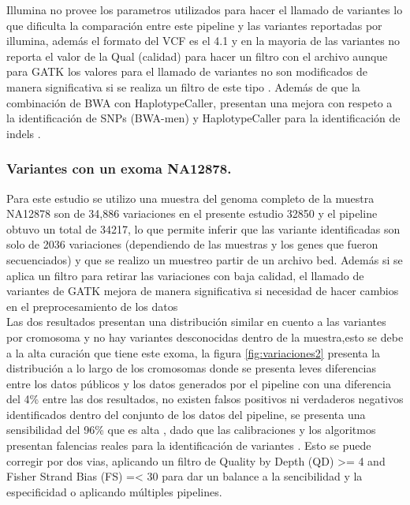 Illumina no provee los parametros utilizados para hacer el llamado de variantes lo que dificulta la comparación entre este pipeline y las variantes reportadas por illumina, además el formato del VCF es el 4.1 y en la mayoria de las variantes no reporta el valor de la Qual (calidad) para hacer un filtro con el archivo aunque para GATK los valores para el llamado de variantes no son modificados de manera significativa si se realiza un filtro de este tipo \cite{Hwang2015}. Además de que la combinación de BWA con HaplotypeCaller, presentan una mejora con respeto a la identificación de SNPs (BWA-men) y HaplotypeCaller para la identificación de indels \cite{Cornish2015}.
\subsubsection{Variantes con un exoma NA12878.}

Para este estudio se utilizo una muestra del genoma completo de la muestra NA12878 son de 34,886 variaciones \cite{Cornish2015} en el presente estudio 32850 y el pipeline obtuvo un total de 34217, lo que permite inferir que las variante identificadas son solo de 2036 variaciones (dependiendo de las muestras y los genes que fueron secuenciados) y que se realizo un muestreo partir de un archivo bed. Además si se aplica un filtro para retirar las variaciones con baja calidad, el llamado de variantes de GATK mejora de manera significativa si necesidad de hacer cambios en el preprocesamiento de los datos \cite{Warden2014} \\

Las dos resultados presentan una distribución similar en cuento a las variantes por cromosoma y no hay variantes desconocidas dentro de la muestra,esto se debe a la alta curación que tiene este exoma, la figura \ref{fig:variaciones2} presenta la distribución a lo largo de los cromosomas donde se presenta leves diferencias entre los datos públicos y los datos generados por el pipeline con una diferencia del 4\% entre las dos resultados, no existen falsos positivos ni verdaderos negativos identificados dentro del conjunto de los datos del pipeline, se presenta una sensibilidad del 96\% que es alta , dado que las calibraciones y los algoritmos presentan falencias reales para la identificación de variantes \cite{Auwera2014}. Esto se puede corregir por dos vias, aplicando un filtro de Quality by Depth (QD) >= 4 and Fisher Strand Bias (FS) =< 30 para dar un balance  a la sencibilidad y la especificidad \cite{Tsai2016} o aplicando múltiples pipelines.\\

